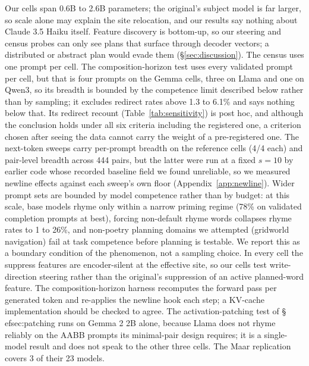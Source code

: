 \documentclass[11pt]{article}
\begin{document}
Our cells span 0.6B to 2.6B parameters; the original's subject model is far larger, so scale alone may explain the site relocation, and our results say nothing about Claude 3.5 Haiku itself. Feature discovery is bottom-up, so our steering and census probes can only see plans that surface through decoder vectors; a distributed or abstract plan would evade them (\S\ref{sec:discussion}). The census uses one prompt per cell. The composition-horizon test uses every validated prompt per cell, but that is four prompts on the Gemma cells, three on Llama and one on Qwen3, so its breadth is bounded by the competence limit described below rather than by sampling; it excludes redirect rates above 1.3 to 6.1\% and says nothing below that. Its redirect recount (Table~\ref{tab:sensitivity}) is post hoc, and although the conclusion holds under all six criteria including the registered one, a criterion chosen after seeing the data cannot carry the weight of a pre-registered one. The next-token sweeps carry per-prompt breadth on the reference cells (4/4 each) and pair-level breadth across 444 pairs, but the latter were run at a fixed $s{=}10$ by earlier code \citep{pliprs2026} whose recorded baseline field we found unreliable, so we measured newline effects against each sweep's own floor (Appendix~\ref{app:newline}). Wider prompt sets are bounded by model competence rather than by budget: at this scale, base models rhyme only within a narrow priming regime (78\% on validated completion prompts at best), forcing non-default rhyme words collapses rhyme rates to 1 to 26\%, and non-poetry planning domains we attempted (gridworld navigation) fail at task competence before planning is testable. We report this as a boundary condition of the phenomenon, not a sampling choice. In every cell the suppress features are encoder-silent at the effective site, so our cells test write-direction steering rather than the original's suppression of an active planned-word feature. The composition-horizon harness recomputes the forward pass per generated token and re-applies the newline hook each step; a KV-cache implementation should be checked to agree. The activation-patching test of \S
ef{sec:patching} runs on Gemma 2 2B alone, because Llama does not rhyme reliably on the AABB prompts its minimal-pair design requires; it is a single-model result and does not speak to the other three cells. The Maar replication covers 3 of their 23 models.
\end{document}
